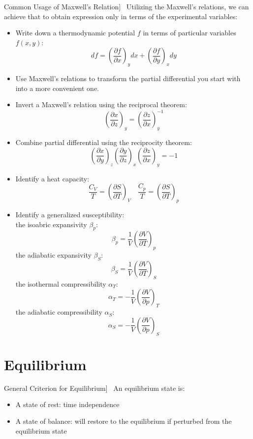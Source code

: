 \documentclass[UTF8]{book}
\newenvironment{theorem}[2][Theorem]{\begin{trivlist}
\item[\hskip \labelsep {\bfseries #1}\hskip \labelsep {\bfseries }]}{\end{trivlist}}
\begin{document}
\begin{theorem}
[Common Usage of Maxwell's Relation]~  {Utilizing the Maxwell's relations, we can achieve that to obtain expression only in terms of the experimental variables:}
\begin{itemize}
\item  {Write down a thermodynamic potential $f$ in terms of particular variables $f(x,y)$:}
$$df=\left(\dfrac{\partial f}{\partial x}\right)_ydx+\left(\dfrac{\partial f}{\partial y}\right)_xdy$$
\item  {Use Maxwell's relations to transform the partial differential you start with into a more convenient one.} 
\item  {Invert a Maxwell's relation using the reciprocal theorem:}
$$\left(\dfrac{\partial x}{\partial z}\right)_y=\left(\dfrac{\partial z}{\partial x}\right)_y^{-1}$$
\item  {Combine partial differential using the reciprocity theorem:}
$$\left(\dfrac{\partial x}{\partial y}\right)_z\left(\dfrac{\partial y}{\partial z}\right)_x\left(\dfrac{\partial z}{\partial x}\right)_y=-1$$
\item  {Identify a heat capacity:}
$$\dfrac{C_V}{T}=\left(\dfrac{\partial S}{\partial T}\right)_V \quad \dfrac{C_p}{T}=\left(\dfrac{\partial S}{\partial T}\right)_p$$
\item  {Identify a generalized susceptibility:}\\
 {the isoabric expansivity $\beta _p$:}
$$\beta _p =\dfrac{1}{V}\left(\dfrac{\partial V}{\partial T}\right)_p$$
 {the adiabatic expansivity $\beta_S$:}
$$\beta _S =\dfrac{1}{V}\left(\dfrac{\partial V}{\partial T}\right)_S$$
 {the isothermal compressibility $\alpha _T$:}
$$\alpha _T =-\dfrac{1}{V}\left(\dfrac{\partial V}{\partial p}\right)_T$$
 {the adiabatic compressibility $\alpha _S$:}
$$\alpha _S =-\dfrac{1}{V}\left(\dfrac{\partial V}{\partial p}\right)_S$$
\end{itemize}
\end{theorem}

\section{Equilibrium}
\begin{theorem}
[General Criterion for Equilibrium]~  {An equilibrium state is:}
\begin{itemize}
\item  {A state of rest: time independence}
\item  {A state of balance: will restore to the equilibrium if perturbed from the equilibrium state}
\end{itemize}
\end{theorem}
\end{document}
